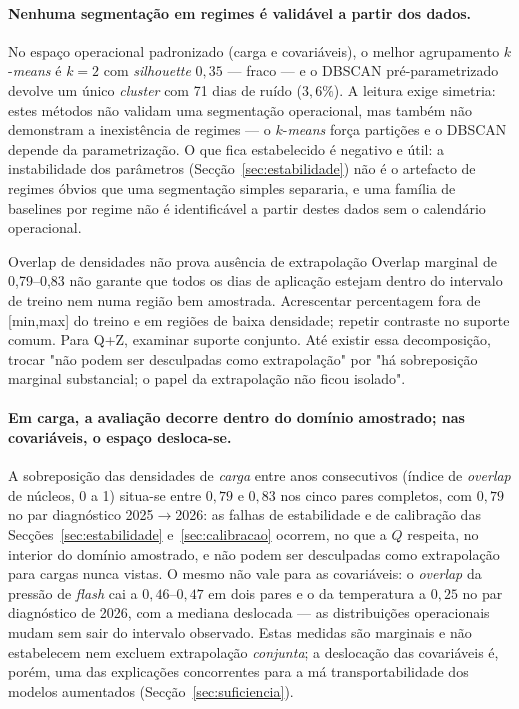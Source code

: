 \paragraph{Nenhuma segmentação em regimes é validável a partir dos dados.} No espaço operacional padronizado (carga e covariáveis), o melhor
agrupamento $k$-\emph{means} é $k{=}2$ com \emph{silhouette} $0{,}35$ ---
fraco --- e o DBSCAN pré-parametrizado devolve um único \emph{cluster} com 71
dias de ruído ($3{,}6\%$). A leitura exige simetria: estes métodos não
validam uma segmentação operacional, mas também não demonstram a inexistência
de regimes --- o $k$-\emph{means} força partições e o DBSCAN depende da
parametrização. O que fica estabelecido é negativo e útil: a instabilidade
dos parâmetros (Secção~\ref{sec:estabilidade}) não é o artefacto de
regimes óbvios que uma segmentação simples separaria, e uma família de
baselines por regime não é identificável a partir destes dados sem o
calendário operacional.

{Overlap de densidades não prova ausência de extrapolação}
{Overlap marginal de 0,79--0,83 não garante que todos os dias de aplicação
estejam dentro do intervalo de treino nem numa região bem amostrada.
Acrescentar percentagem fora de [min,max] do treino e em regiões de
baixa densidade; repetir contraste no suporte comum. Para Q+Z,
examinar suporte conjunto. Até existir essa decomposição, trocar
"não podem ser desculpadas como extrapolação" por "há sobreposição
marginal substancial; o papel da extrapolação não ficou isolado".}%
\paragraph{Em carga, a avaliação decorre dentro do domínio amostrado; nas
covariáveis, o espaço desloca-se.} A sobreposição das densidades de
\emph{carga} entre anos consecutivos (índice de \emph{overlap} de núcleos, 0
a 1) situa-se entre $0{,}79$ e $0{,}83$ nos cinco pares completos, com
$0{,}79$ no par diagnóstico 2025${\to}$2026: as falhas de estabilidade e de
calibração das Secções~\ref{sec:estabilidade} e~\ref{sec:calibracao}
ocorrem, no que a $Q$ respeita, no interior do domínio amostrado, e não podem
ser desculpadas como extrapolação para cargas nunca vistas. O mesmo não vale
para as covariáveis: o \emph{overlap} da pressão de \emph{flash} cai a
$0{,}46$--$0{,}47$ em dois pares e o da temperatura a $0{,}25$ no par
diagnóstico de 2026, com a mediana deslocada --- as distribuições
operacionais mudam sem sair do intervalo observado. Estas medidas são
marginais e não estabelecem nem excluem extrapolação \emph{conjunta}; a
deslocação das covariáveis é, porém, uma das explicações concorrentes para a
má transportabilidade dos modelos aumentados
(Secção~\ref{sec:suficiencia}).

